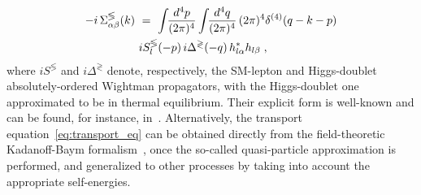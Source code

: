 \documentclass[prd,twocolumn,superscriptaddress,preprintnumbers,nofootinbib,
noshowpacs,groupedaddress]{revtex4-1} %
\begin{document}
\begin{align}
- i \, \Sigma_{\alpha \beta}^{\lessgtr}(k) \ &= \ \int \! \! \frac{d^4 p}{(2 \pi)^4} \int \! \!  \frac{d^4 q}{(2 \pi)^4} \, (2 \pi)^4 \delta^{(4)}(q-k-p) \notag\\
&i S^{\lessgtr}_l(-p) \, i \Delta^{\gtrless} (-q) \, h^*_{l \alpha} h_{l \beta} \;,
\end{align}
where $i S^{\lessgtr}$ and $i \Delta^{\gtrless}$ denote, respectively, the SM-lepton and Higgs-doublet  absolutely-ordered Wightman propagators, with the Higgs-doublet one approximated to be in thermal equilibrium. Their explicit form is well-known and can be found, for instance, in~\cite{Bellac:2011kqa}. Alternatively, the transport equation~\eqref{eq:transport_eq} can be obtained directly from the field-theoretic Kadanoff-Baym formalism~\cite{Beneke:2010dz,Dev:2014wsa,Drewes:2016gmt}, once the so-called quasi-particle approximation is performed, and generalized to other processes by taking into account the appropriate self-energies. 
\end{document}

